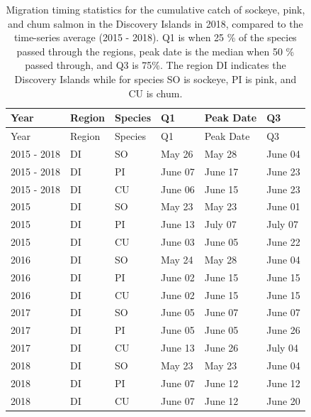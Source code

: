 \documentclass[fleqn,10pt]{wlpeerj} %
\begin{document}
\begin{longtable}[]{@{}llllll@{}}
\caption{\label{tab:mtdi} Migration timing statistics for the cumulative
catch of sockeye, pink, and chum salmon in the Discovery Islands in
2018, compared to the time-series average (2015 - 2018). Q1 is when 25
\% of the species passed through the regions, peak date is the median
when 50 \% passed through, and Q3 is 75\%. The region DI indicates the
Discovery Islands while for species SO is sockeye, PI is pink, and CU is
chum.}\tabularnewline
\toprule
Year & Region & Species & Q1 & Peak Date & Q3\tabularnewline
\midrule
\endfirsthead
\toprule
Year & Region & Species & Q1 & Peak Date & Q3\tabularnewline
\midrule
\endhead
2015 - 2018 & DI & SO & May 26 & May 28 & June 04\tabularnewline
2015 - 2018 & DI & PI & June 07 & June 17 & June 23\tabularnewline
2015 - 2018 & DI & CU & June 06 & June 15 & June 23\tabularnewline
2015 & DI & SO & May 23 & May 23 & June 01\tabularnewline
2015 & DI & PI & June 13 & July 07 & July 07\tabularnewline
2015 & DI & CU & June 03 & June 05 & June 22\tabularnewline
2016 & DI & SO & May 24 & May 28 & June 04\tabularnewline
2016 & DI & PI & June 02 & June 15 & June 15\tabularnewline
2016 & DI & CU & June 02 & June 15 & June 15\tabularnewline
2017 & DI & SO & June 05 & June 07 & June 07\tabularnewline
2017 & DI & PI & June 05 & June 05 & June 26\tabularnewline
2017 & DI & CU & June 13 & June 26 & July 04\tabularnewline
2018 & DI & SO & May 23 & May 23 & June 04\tabularnewline
2018 & DI & PI & June 07 & June 12 & June 12\tabularnewline
2018 & DI & CU & June 07 & June 12 & June 20\tabularnewline
\bottomrule
\end{longtable}
\end{document}
